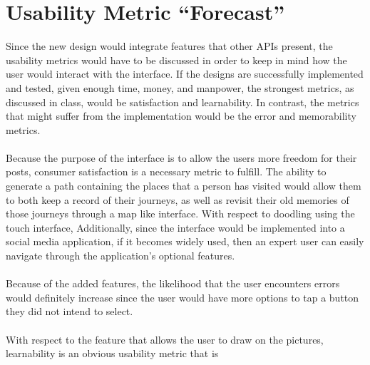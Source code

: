 \documentclass[11pt]{article}
\begin{document}
\section{Usability Metric ``Forecast''}
   \indent 
   \indent Since the new design would integrate features that other APIs present, the usability metrics would have to be discussed in order to keep in mind how the user would interact with the interface. If the designs are successfully implemented and tested, given enough time, money, and manpower, the strongest metrics, as discussed in class, would be satisfaction and learnability. In contrast, the metrics that might suffer from the implementation would be the error and memorability metrics.\\ \\
   \indent Because the purpose of the interface is to allow the users more freedom for their posts, consumer satisfaction is a necessary metric to fulfill. The ability to generate a path containing the places that a person has visited would allow them to both keep a record of their journeys, as well as revisit their old memories of those journeys through a map like interface. With respect to doodling using the touch interface, Additionally, since the interface would be implemented into a social media application, if it becomes widely used, then an expert user can easily navigate through the application's optional features.\\ \\
   \indent Because of the added features, the likelihood that the user encounters errors would definitely increase since the user would have more options to tap a button they did not intend to select. \\ \\
   \indent With respect to the feature that allows the user to draw on the pictures, learnability is an obvious usability metric that is \\

\clearpage


\end{document}
